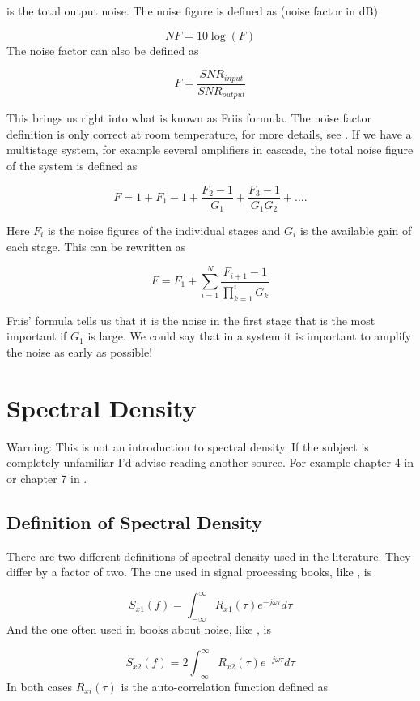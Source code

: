 is the total output noise. The noise figure is defined as (noise factor
in dB)

\[NF = 10 \log(F)\] The noise factor can also be defined as

\[F = \frac{SNR_{input}}{SNR_{output}}\]

This brings us right into what is known as Friis formula. The noise
factor definition is only correct at room temperature, for more details,
see . If we have a multistage system, for
example several amplifiers in cascade, the total noise figure of the
system is defined as

\[F = 1 + F_1 - 1 + \frac{F_2 -1}{G_{1}} +
  \frac{F_3-1}{G_{1}G_{2}} + ....\]

Here \(F_i\) is the noise figures of the individual stages and \(G_i\)
is the available gain of each stage. This can be rewritten as

\[F = F_1 + \sum_{i=1}^N{\frac{F_{i+1} - 1}{\prod_{k=1}^{i}{G_{k}}}}\]

Friis' formula tells us that it is the noise in the first stage that is
the most important if \(G_1\) is large. We could say that in a system it
is important to amplify the noise as early as possible!

\section{Spectral Density}\label{spectral-density}

Warning: This is not an introduction to spectral density. If the subject
is completely unfamiliar I'd advise reading another source. For example
chapter 4 in  or chapter 7 in
.

\subsection{Definition of Spectral
Density}\label{definition-of-spectral-density}

There are two different definitions of spectral density used in the
literature. They differ by a factor of two. The one used in signal
processing books, like , is

\[S_{x1}(f) = \int_{-\infty}^{\infty}{R_{x1}(\tau)e^{-j\omega\tau}d\tau}\]
And the one often used in books about noise, like
, is

\[S_{x2}(f) = 2\int_{-\infty}^{\infty}{R_{x2}(\tau)e^{-j\omega\tau}d\tau}\]
In both cases \(R_{xi}(\tau)\) is the auto-correlation function defined
as

